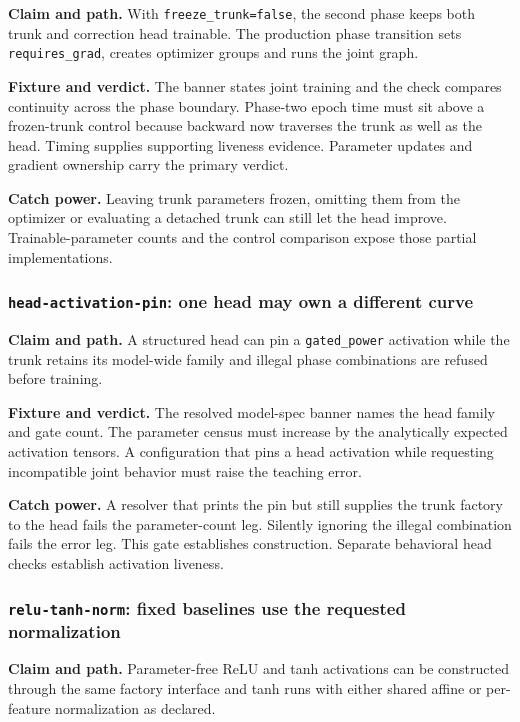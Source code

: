 \documentclass[10pt,aps,prd,twocolumn,nofootinbib]{revtex4-2}
\newcommand{\code}[1]{\texttt{#1}}
\begin{document}
\textbf{Claim and path.}  With \code{freeze\_trunk=false}, the second phase
keeps both trunk and correction head trainable.  The production phase
transition sets \code{requires\_grad}, creates optimizer groups and runs the
joint graph.

\textbf{Fixture and verdict.}  The banner states joint training and the check
compares continuity across the phase boundary.  Phase-two epoch time must sit
above a frozen-trunk control because backward now traverses the trunk as well
as the head.  Timing supplies supporting liveness evidence.  Parameter updates
and gradient ownership carry the primary verdict.

\textbf{Catch power.}  Leaving trunk parameters frozen, omitting them from the
optimizer or evaluating a detached trunk can still let the head improve.
Trainable-parameter counts and the control comparison expose those partial
implementations.

\subsubsection{\code{head-activation-pin}: one head may own a different curve}

\textbf{Claim and path.}  A structured head can pin a \code{gated\_power}
activation while the trunk retains its model-wide family and illegal phase
combinations are refused before training.

\textbf{Fixture and verdict.}  The resolved model-spec banner names the head
family and gate count.  The parameter census must increase by the analytically
expected activation tensors.  A configuration that pins a head activation
while requesting incompatible joint behavior must raise the teaching error.

\textbf{Catch power.}  A resolver that prints the pin but still supplies the
trunk factory to the head fails the parameter-count leg.  Silently ignoring
the illegal combination fails the error leg.  This gate establishes
construction.  Separate behavioral head checks establish activation liveness.

\subsubsection{\code{relu-tanh-norm}: fixed baselines use the requested normalization}

\textbf{Claim and path.}  Parameter-free ReLU and tanh activations can be
constructed through the same factory interface and tanh runs with either
shared affine or per-feature normalization as declared.
\end{document}
